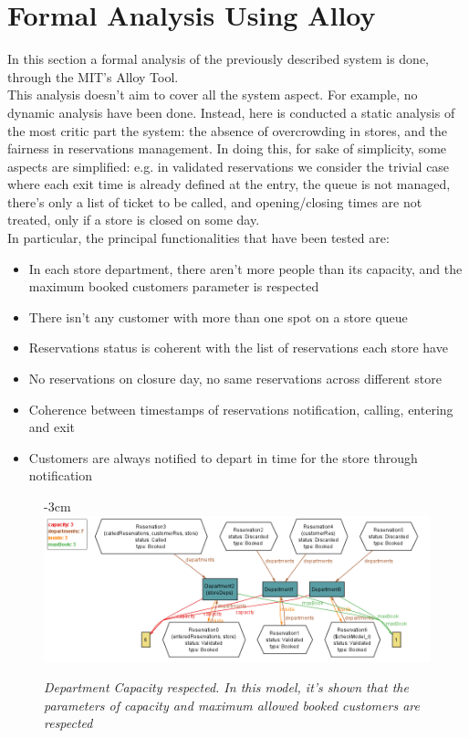 \documentclass{article}
\begin{document}
\section{Formal Analysis Using Alloy}
	In this section a formal analysis of the previously described system is done, through the MIT's Alloy Tool.\\
	This analysis doesn't aim to cover all the system aspect. For example, no dynamic analysis have been done. Instead, here is conducted a static analysis of the most critic part the system: the absence of overcrowding in stores, and the fairness in reservations management. In doing this, for sake of simplicity, some aspects are simplified: e.g. in validated reservations we consider the trivial case where each exit time is already defined at the entry, the queue is not managed, there's only a list of ticket to be called, and opening/closing times are not treated, only if a store is closed on some day. \\
	In particular, the principal functionalities that have been tested are:
	\begin{itemize}
		\item In each store department, there aren't more people than its capacity, and the maximum booked customers parameter is respected
		\item There isn't any customer with more than one spot on a store queue
		\item Reservations status is coherent with the list of reservations each store have
		\item No reservations on closure day, no same reservations across different store
		\item Coherence between timestamps of reservations notification, calling, entering and exit
		\item Customers are always notified to depart in time for the store through notification
	\end{itemize}
	
	
	\begin{figure}[H]
		\begin{adjustwidth} {-3cm}{}
			\centering			
			\includegraphics[scale=0.5]{AlloyModel/capacityRespected.png}\\
		\end{adjustwidth}
		\caption{\emph{Department Capacity respected. In this model, it's shown that the parameters of capacity and maximum allowed booked customers are respected}}
	\end{figure}
	
\end{document}
